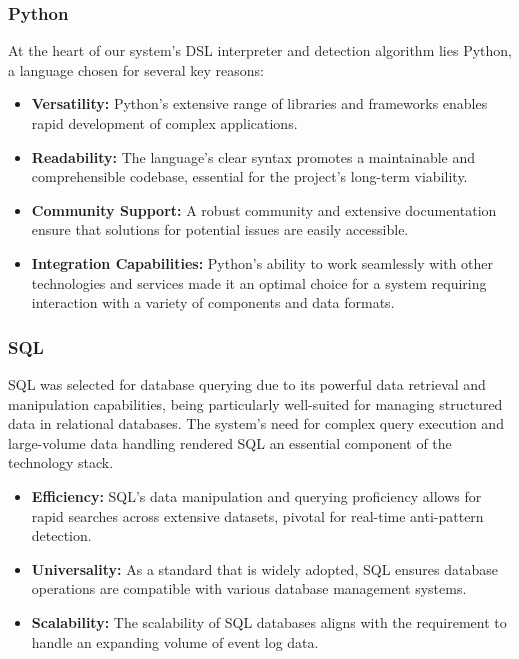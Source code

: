 \documentclass[12pt, times]{article}
\begin{document}
		\subsubsection*{Python}
		
		At the heart of our system's DSL interpreter and detection algorithm lies Python, a language chosen for several key reasons:
		
		\begin{itemize}
			\item \textbf{Versatility:} Python's extensive range of libraries and frameworks enables rapid development of complex applications.
			\item \textbf{Readability:} The language's clear syntax promotes a maintainable and comprehensible codebase, essential for the project's long-term viability.
			\item \textbf{Community Support:} A robust community and extensive documentation ensure that solutions for potential issues are easily accessible.
			\item \textbf{Integration Capabilities:} Python's ability to work seamlessly with other technologies and services made it an optimal choice for a system requiring interaction with a variety of components and data formats.
		\end{itemize}
		
		\subsubsection*{SQL}
		
		\hspace*{5mm}SQL was selected for database querying due to its powerful data retrieval and manipulation capabilities, being particularly well-suited for managing structured data in relational databases. The system's need for complex query execution and large-volume data handling rendered SQL an essential component of the technology stack.
		
		\begin{itemize}
			\item \textbf{Efficiency:} SQL's data manipulation and querying proficiency allows for rapid searches across extensive datasets, pivotal for real-time anti-pattern detection.
			\item \textbf{Universality:} As a standard that is widely adopted, SQL ensures database operations are compatible with various database management systems.
			\item \textbf{Scalability:} The scalability of SQL databases aligns with the requirement to handle an expanding volume of event log data.
		\end{itemize}
		
\end{document}
